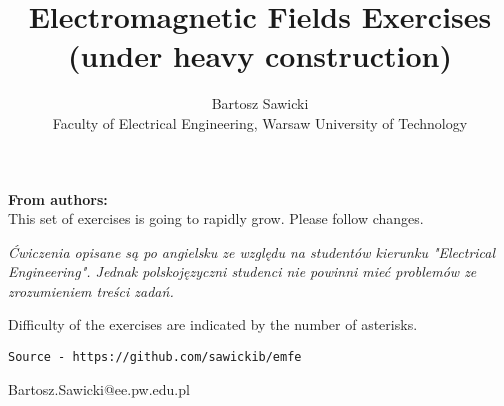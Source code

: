 \documentclass[10pt,a4paper]{article}
\title{Electromagnetic Fields Exercises\\ \vspace{0.5cm} \large{(under heavy construction)}}
\author{Bartosz Sawicki \\ \small{Faculty of Electrical Engineering, Warsaw University of Technology}}
\begin{document}
\maketitle

\noindent\textbf{From authors:}\\
This set of exercises is going to rapidly grow. Please follow changes. 

\noindent\textit{Ćwiczenia opisane są po angielsku ze względu na studentów kierunku "Electrical Engineering". Jednak polskojęzyczni studenci nie powinni mieć problemów ze zrozumieniem treści zadań.}

\noindent Difficulty of the exercises are indicated by the number of asterisks. 

\noindent\verb+Source - https://github.com/sawickib/emfe+

\vspace{0.3cm}
\begin{flushright}
Bartosz.Sawicki@ee.pw.edu.pl
\end{flushright}

\tableofcontents

\newpage





\end{document}
